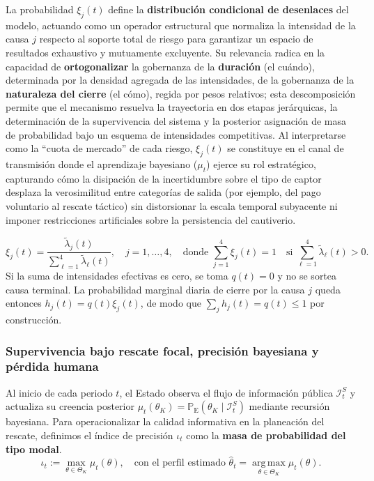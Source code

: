 \documentclass[12pt]{article}
\theoremstyle{definition}
\theoremstyle{remark}
\newcommand{\ProbE}{\mathbb{P}_{\mathrm{E}}}
\newcommand{\1}{\mathbf{1}}
\begin{document}
\noindent La probabilidad $\xi_j(t)$ define la \textbf{distribución condicional de desenlaces} del modelo, actuando como un operador estructural que normaliza la intensidad de la causa $j$ respecto al soporte total de riesgo para garantizar un espacio de resultados exhaustivo y mutuamente excluyente. Su relevancia radica en la capacidad de \textbf{ortogonalizar} la gobernanza de la \textbf{duración} (el cuándo), determinada por la densidad agregada de las intensidades, de la gobernanza de la \textbf{naturaleza del cierre} (el cómo), regida por pesos relativos; esta descomposición permite que el mecanismo resuelva la trayectoria en dos etapas jerárquicas, la determinación de la supervivencia del sistema y la posterior asignación de masa de probabilidad bajo un esquema de intensidades competitivas. Al interpretarse como la ``cuota de mercado'' de cada riesgo, $\xi_j(t)$ se constituye en el canal de transmisión donde el aprendizaje bayesiano ($\mu_t$) ejerce su rol estratégico, capturando cómo la disipación de la incertidumbre sobre el tipo de captor desplaza la verosimilitud entre categorías de salida (por ejemplo, del pago voluntario al rescate táctico) sin distorsionar la escala temporal subyacente ni imponer restricciones artificiales sobre la persistencia del cautiverio.

\begin{equation}
\label{eq:xi}
\xi_j(t)=
\frac{\tilde{\lambda}_j(t)}{\sum_{\ell=1}^{4}\tilde{\lambda}_{\ell}(t)}, 
\quad j=1,\dots,4,
\quad \text{donde } \sum_{j=1}^{4}\xi_j(t)=1
\quad \text{si } \sum_{\ell=1}^{4}\tilde{\lambda}_{\ell}(t)>0.
\end{equation}
\noindent Si la suma de intensidades efectivas es cero, se toma $q(t)=0$ y no se sortea causa terminal. La probabilidad marginal diaria de cierre por la causa $j$ queda entonces $h_j(t)=q(t)\xi_j(t)$, de modo que $\sum_j h_j(t)=q(t)\le 1$ por construcción.
\subsubsection{Supervivencia bajo rescate focal, precisión bayesiana y pérdida humana}
\label{subsec:rescate-survival-precision}


Al inicio de cada periodo $t$, el Estado observa el flujo de información pública $\mathcal{I}_t^S$ y actualiza su creencia posterior $\mu_t(\theta_K)=\ProbE(\theta_K\mid\mathcal{I}_t^S)$ mediante recursión bayesiana. Para operacionalizar la calidad informativa en la planeación del rescate, definimos el índice de precisión $\iota_t$ como la \textbf{masa de probabilidad del tipo modal}.
\begin{equation}
\label{eq:iota-precision-mode}
\iota_t := \max_{\theta\in\Theta_K}\mu_t(\theta), \quad \text{con el perfil estimado } \hat{\theta}_t = \operatorname*{arg\,max}_{\theta\in\Theta_K}\mu_t(\theta).
\end{equation}
\end{document}
